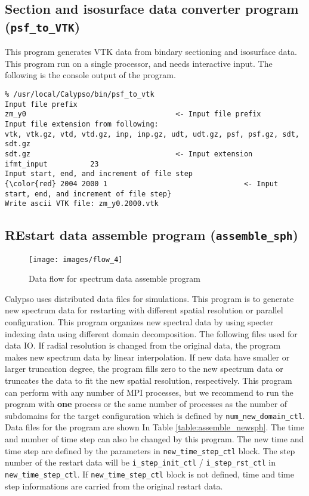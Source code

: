 \subsection{Section and isosurface data converter program ({\tt psf\_to\_VTK})} 
\label{section:psf_to_VTK}
This program generates VTK data from bindary sectioning and isosurface data. This program run on a single processor, and needs interactive input. The following is the console output of the program.

{\small
\begin{verbatim}
% /usr/local/Calypso/bin/psf_to_vtk 
Input file prefix
zm_y0									<- Input file prefix
Input file extension from following:
vtk, vtk.gz, vtd, vtd.gz, inp, inp.gz, udt, udt.gz, psf, psf.gz, sdt, sdt.gz  
sdt.gz									<- Input extension
ifmt_input          23
Input start, end, and increment of file step
{\color{red} 2004 2000 1								<- Input start, end, and increment of file step} 
Write ascii VTK file: zm_y0.2000.vtk
\end{verbatim}
}

\subsection{REstart data assemble program ({\tt assemble\_sph})}
\label{section:assemble_sph}
%
\begin{figure}[htbp]
\begin{center}
\texttt{[image: images/flow\_4]}
\end{center}
\caption{Data flow for spectrum data assemble program}
\label{fig:flow_4}
\end{figure}
%
Calypso uses distributed data files for simulations. This program is to generate new spectrum data for restarting with different spatial resolution or parallel configuration. This program organizes new spectral data by using specter indexing data using different domain decomposition. The following files used for data IO. If radial resolution is changed from the original data, the program makes new spectrum data by linear interpolation. If new data have smaller or larger truncation degree, the program fills zero to the new spectrum data or truncates the data to fit the new spatial resolution, respectively. This program can perform with any number of MPI processes, but we recommend to run the program with {\bf one} process or the same number of processes as the number of subdomains for the target configuration which is defined by \verb|num_new_domain_ctl|. Data files for the program are shown In Table \ref{table:assemble_newsph}. The time and number of time step can also be changed by this program. The new time and time step are defined by the parameters in \verb|new_time_step_ctl| block. The step number of the restart data will be \verb|i_step_init_ctl| / \verb|i_step_rst_ctl| in  \verb|new_time_step_ctl|. If \verb|new_time_step_ctl| block is not defined, time and time step informations are carried from the original restart data.

